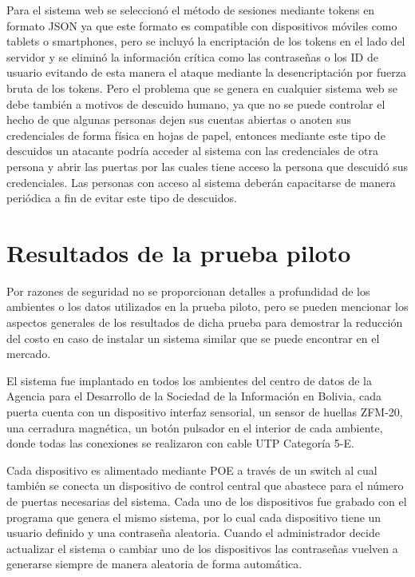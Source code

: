 \documentclass[../principal]{subfiles}
\begin{document}
  Para el sistema web se seleccionó el método de sesiones mediante tokens en formato JSON ya que este formato es compatible con dispositivos móviles como tablets o smartphones, pero se incluyó la encriptación de los tokens en el lado del servidor y se eliminó la información crítica como las contraseñas o los ID de usuario evitando de esta manera el ataque mediante la desencriptación por fuerza bruta de los tokens. Pero el problema que se genera en cualquier sistema web se debe también a motivos de descuido humano, ya que no se puede controlar el hecho de que algunas personas dejen sus cuentas abiertas o anoten sus credenciales de forma física en hojas de papel, entonces mediante este tipo de descuidos un atacante podría acceder al sistema con las credenciales de otra persona y abrir las puertas por las cuales tiene acceso la persona que descuidó sus credenciales. Las personas con acceso al sistema deberán capacitarse de manera periódica a fin de evitar este tipo de descuidos.

  \section{Resultados de la prueba piloto}

  Por razones de seguridad no se proporcionan detalles a profundidad de los ambientes o los datos utilizados en la prueba piloto, pero se pueden mencionar los aspectos generales de los resultados de dicha prueba para demostrar la reducción del costo en caso de instalar un sistema similar que se puede encontrar en el mercado.

  El sistema fue implantado en todos los ambientes del centro de datos de la Agencia para el Desarrollo de la Sociedad de la Información en Bolivia, cada puerta cuenta con un dispositivo interfaz sensorial, un sensor de huellas ZFM-20, una cerradura magnética, un botón pulsador en el interior de cada ambiente, donde todas las conexiones se realizaron con cable UTP Categoría 5-E.

  Cada dispositivo es alimentado mediante POE a través de un switch al cual también se conecta un dispositivo de control central que abastece para el número de puertas necesarias del sistema. Cada uno de los dispositivos fue grabado con el programa que genera el mismo sistema, por lo cual cada dispositivo tiene un usuario definido y una contraseña aleatoria. Cuando el administrador decide actualizar el sistema o cambiar uno de los dispositivos las contraseñas vuelven a generarse siempre de manera aleatoria de forma automática.
\end{document}
